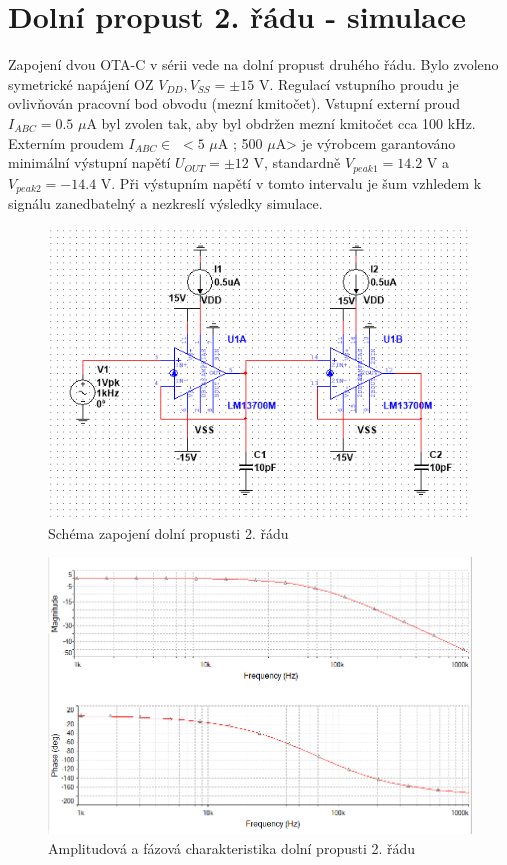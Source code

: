 \documentclass[twoside]{article}
\begin{document}
\section{Dolní propust 2. řádu - simulace}
Zapojení dvou OTA-C v sérii vede na dolní propust druhého řádu. Bylo zvoleno symetrické napájení OZ $V_{DD},V_{SS} = \pm 15$ V. Regulací vstupního proudu je ovlivňován pracovní bod obvodu (mezní kmitočet). Vstupní externí proud $I_{ABC} = 0.5$ $\mu$A byl zvolen tak, aby byl obdržen mezní kmitočet cca 100 kHz. Externím proudem $I_{ABC} \in$ $<5$ $\mu$A ; 500 $\mu$A> je výrobcem garantováno minimální výstupní napětí $U_{OUT} = \pm 12$ V, standardně $V_{peak 1} = 14.2$ V a $V_{peak 2} = -14.4$ V. Při výstupním napětí v tomto intervalu je šum vzhledem k signálu zanedbatelný a nezkreslí výsledky simulace.\\
\begin{figure}[H]
\centering
\includegraphics[scale=0.75]{1503.png}
\caption{Schéma zapojení dolní propusti 2. řádu}
\end{figure}
\begin{figure}[H]
\centering
\includegraphics[scale=0.75]{15032.png}
\caption{Amplitudová a fázová charakteristika dolní propusti 2. řádu}
\end{figure}
\end{document}
